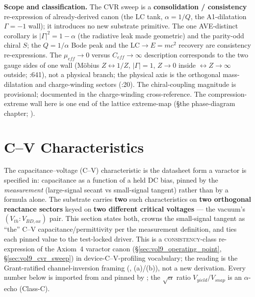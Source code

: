 \textbf{Scope and classification.} The CVR sweep is a \textbf{consolidation / consistency} re-expression of already-derived canon (the LC tank, $\alpha=1/Q$, the A1-dilatation $\Gamma=-1$\gammaundeclared{} wall); it introduces no new substrate primitive. The one AVE-distinct corollary is $|\Gamma|^2=1-\alpha$ (the radiative leak made geometric) and the parity-odd chiral $S$; the $Q=1/\alpha$ Bode peak and the LC$\to E=mc^2$ recovery are consistency re-expressions. The $\mu_{eff}\to0$ versus $C_{eff}\to\infty$ description corresponds to the two gauge sides of one wall (M\"obius $Z\leftrightarrow1/Z$, $|\Gamma|=1$\gammaundeclared{}, $Z\to0$ inside $\leftrightarrow Z\to\infty$ outside; :641), not a physical branch; the physical axis is the orthogonal mass-dilatation and charge-winding sectors (:20). The chiral-coupling magnitude is provisional; documented in the charge-winding cross-reference. The compression-extreme wall here is one end of the lattice extreme-map (\S the phase-diagram chapter; ).

\section{C--V Characteristics}
\label{sec:vol9_cv_characteristics}

The capacitance--voltage (C--V) characteristic is the datasheet form a varactor
is specified in: capacitance as a function of a held DC bias, pinned by the
\emph{measurement} (large-signal secant vs small-signal tangent) rather than by a
formula alone. The substrate carries \textbf{two} such characteristics on
\textbf{two orthogonal reactance sectors} keyed on \textbf{two different critical
voltages} --- the vacuum's $(V_{th}:V_{BD,ox})$ pair. This section states both,
crowns the small-signal tangent as ``the'' C--V capacitance/permittivity per the
measurement definition, and ties each pinned value to the test-locked driver.
This is a \textsc{consistency}-class re-expression of the Axiom~4 varactor canon
(\S\ref{sec:vol9_operating_point}, \S\ref{sec:vol9_cvr_sweep}) in
device-C--V-profiling vocabulary; the reading is the Grant-ratified
channel-inversion framing (,
(a)/(b)), not a new derivation. Every number below is imported from
 and pinned by
; the $\sqrt{\alpha}$ ratio
$V_{yield}/V_{snap}$ is an $\alpha$-echo (Class-C).

